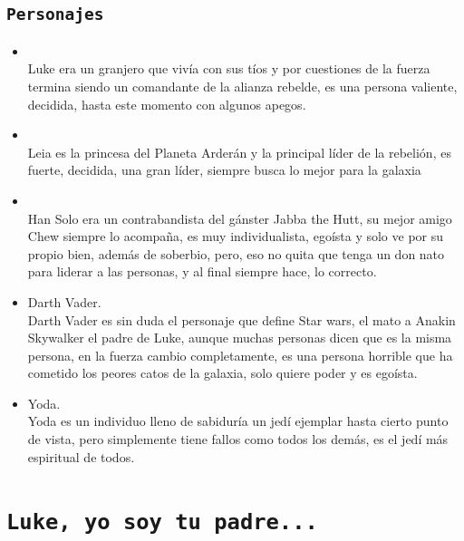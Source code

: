 \documentclass[11pt, a5paper]{article}
\begin{document}
\subsection{{\tt{Personajes}}}
 {\footnotesize{\begin{itemize}
\item{}\\
Luke era un granjero que vivía con sus tíos y por cuestiones de la fuerza termina siendo un comandante de la alianza rebelde, es una persona valiente, decidida, hasta este momento con algunos apegos.
\item{}\\
Leia es la princesa del Planeta Arderán y la principal líder de la rebelión, es fuerte, decidida, una gran líder, siempre busca lo mejor para la galaxia
\item{}\\
Han Solo era un contrabandista del gánster Jabba the Hutt, su mejor amigo Chew siempre lo acompaña, es muy individualista, egoísta y solo ve por su propio bien, además de soberbio, pero, eso no quita que tenga un don nato para liderar a las personas, y al final siempre hace, lo correcto.
\item Darth Vader.\\
Darth Vader es sin duda el personaje que define Star wars, el mato a Anakin Skywalker el padre de Luke, aunque muchas personas dicen que es la misma persona, en la fuerza cambio completamente, es una persona horrible que ha cometido los peores catos de la galaxia, solo quiere poder y es egoísta.
\item Yoda.\\
Yoda es un individuo lleno de sabiduría un jedí ejemplar hasta cierto punto de vista, pero simplemente tiene fallos como todos los demás, es el jedí más espiritual de todos.
\end{itemize}}}


\section{\large{\tt{Luke, yo soy tu padre...}}}
\end{document}
